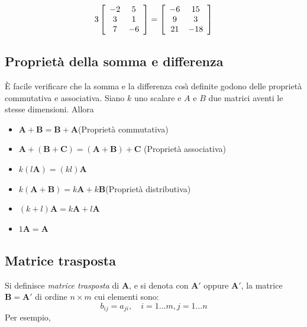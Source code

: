 \documentclass[
  11pt,
]{krantz}
\theoremstyle{definition}
\theoremstyle{definition}
\theoremstyle{definition}
\theoremstyle{definition}
\theoremstyle{remark}
\begin{document}
\[3 \left[ \begin{array}{c c}
-2 & 5\\
3 & 1\\
7 & -6
\end{array}
 \right]=
\left[ \begin{array}{c c}
-6 & 15\\
9 & 3\\
21 & -18
\end{array}
 \right]\]

\hypertarget{proprietuxe0-della-somma-e-differenza}{%
\subsection{Proprietà della somma e differenza}\label{proprietuxe0-della-somma-e-differenza}}

È facile verificare che la somma e la differenza cosı̀ definite godono delle proprietà commutativa e associativa. Siano \(k\) uno scalare e \(A\) e \(B\) due matrici aventi le stesse dimensioni. Allora

\begin{itemize}
\item
  \(\boldsymbol{A}+ \boldsymbol{B} = \boldsymbol{B} + \boldsymbol{A}\)(Proprietà commutativa)
\item
  \(\boldsymbol{A} + (\boldsymbol{B} + \boldsymbol{C}) = (\boldsymbol{A} + \boldsymbol{B}) + \boldsymbol{C}\) (Proprietà associativa)
\item
  \(k(l\boldsymbol{A}) = (kl)\boldsymbol{A}\)
\item
  \(k(\boldsymbol{A} + \boldsymbol{B}) = k\boldsymbol{A} + k\boldsymbol{B}\)(Proprietà distributiva)
\item
  \((k+l)\boldsymbol{A} = k\boldsymbol{A} + l\boldsymbol{A}\)
\item
  \(1\boldsymbol{A} = \boldsymbol{A}\)
\end{itemize}

\hypertarget{matrice-trasposta}{%
\subsection{Matrice trasposta}\label{matrice-trasposta}}

Si definisce \emph{matrice trasposta} di \(\boldsymbol{A}\), e si denota con \(\boldsymbol{A}'\) oppure \(\boldsymbol{A}'\), la matrice \(\boldsymbol{B} = \boldsymbol{A}'\) di ordine \(n \times m\) cui elementi sono: \[b_{ij} = a_{ji},  \quad        i = 1 \dots m, j = 1 \dots n\] Per esempio,
\end{document}
